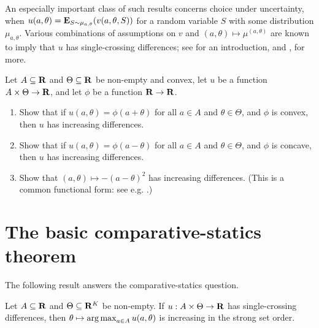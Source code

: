 An especially important class of such results concerns choice under uncertainty, when $u(a,\theta) = \mathbf{E}_{S \sim \mu_{a,\theta}}( v(a,\theta,S) )$ for a random variable $S$ with some distribution $\mu_{a,\theta}$. Various combinations of assumptions on $v$ and $(a,\theta) \mapsto \mu^{(a,\theta)}$ are known to imply that $u$ has single-crossing differences; see \textcite[][section~5]{Sarver2023} for an introduction, and \textcite[Lemma~1]{KarlinRubin1956}, \textcite{Athey2002,QuahStrulovici2012} for more.

\begin{exercise}
	\label{exercise:incr_covnex}
	Let $A \subseteq \mathbf{R}$ and $\Theta \subseteq \mathbf{R}$ be non-empty and convex, let $u$ be a function $A \times \Theta \to \mathbf{R}$, and let $\phi$ be a function $\mathbf{R} \to \mathbf{R}$.

	\begin{enumerate}[label=(\alph*)]
	
		\item Show that if $u(a,\theta) = \phi(a+\theta)$ for all $a \in A$ and $\theta \in \Theta$, and $\phi$ is convex, then $u$ has increasing differences.

		\item Show that if $u(a,\theta) = \phi(a-\theta)$ for all $a \in A$ and $\theta \in \Theta$, and $\phi$ is concave, then $u$ has increasing differences.

		\item Show that $(a,\theta) \mapsto -(a-\theta)^2$ has increasing differences. (This is a common functional form: see e.g. \textcite{CrawfordSobel1982}.)
	
	\end{enumerate}
\end{exercise}



\section{The basic comparative-statics theorem}
\label{mcs:mcs}

The following result answers the comparative-statics question.

\begin{theorem}
	\label{theorem:topkis_ms}
	Let $A \subseteq \mathbf{R}$ and $\Theta \subseteq \mathbf{R}^K$ be non-empty. If $u : A \times \Theta \to \mathbf{R}$ has single-crossing differences, then $\theta \mapsto \operatorname*{arg\,max}_{a \in A} u(a,\theta)$ is increasing in the strong set order.
\end{theorem}

